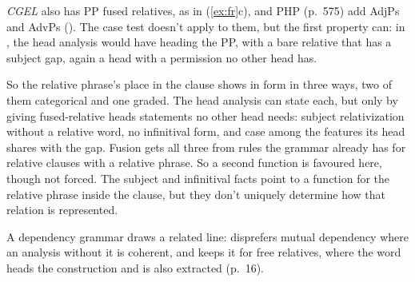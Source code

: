 \textit{CGEL} also has PP fused relatives, as in (\ref{ex:fr}c), and PHP (p.~575) add AdjPs and AdvPs (). The case test doesn't apply to them, but the first property can: in , the head analysis would have  heading the PP, with a bare relative that has a subject gap, again a head with a permission no other head has.

So the relative phrase's place in the clause shows in form in three ways, two of them categorical and one graded. The head analysis can state each, but only by giving fused-relative heads statements no other head needs: subject relativization without a relative word, no infinitival form, and case among the features its head shares with the gap. Fusion gets all three from rules the grammar already has for relative clauses with a relative phrase. So a second function is favoured here, though not forced. The subject and infinitival facts point to a function for the relative phrase inside the clause, but they don't uniquely determine how that relation is represented.

A dependency grammar draws a related line: \textcite[2]{gisborne2026mutual} disprefers mutual dependency where an analysis without it is coherent, and keeps it for free relatives, where the  word heads the construction and is also extracted (p.~16).

